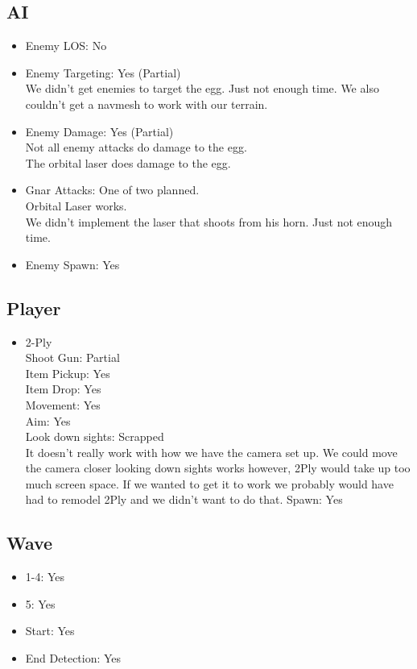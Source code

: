 \documentclass{article}
\begin{document}
\subsection{AI}
\begin{itemize}
\item Enemy LOS: No

\item Enemy Targeting: Yes (Partial)\\
	We didn't get enemies to target the egg. Just not enough time. We also couldn't get a navmesh to work with our terrain.

\item Enemy Damage: Yes (Partial)\\
	Not all enemy attacks do damage to the egg.\\
    The orbital laser does damage to the egg.

\item Gnar Attacks: One of two planned.\\
	Orbital Laser works.\\
    We didn't implement the laser that shoots from his horn. Just not enough time.

\item Enemy Spawn: Yes
\end{itemize}

\subsection{Player}
\begin{itemize}
\item 2-Ply\\
	Shoot Gun: Partial\\
    Item Pickup: Yes\\
    Item Drop: Yes\\
    Movement: Yes\\
    Aim: Yes\\
    Look down sights: Scrapped\\
    	It doesn't really work with how we have the camera set up. We could move the camera closer looking down sights works however, 2Ply would take up too much screen space. If we wanted to get it to work we probably would have had to remodel 2Ply and we didn't want to do that.
    Spawn: Yes
\end{itemize}

\subsection{Wave}
\begin{itemize}
\item 1-4: Yes
\item 5: Yes
\item Start: Yes
\item End Detection: Yes
\end{itemize}
\end{document}

